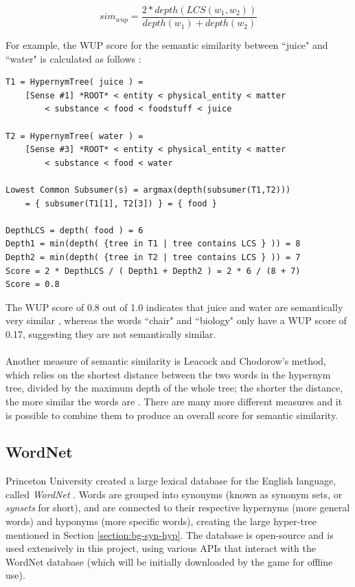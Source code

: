 \documentclass[11pt]{article}
\begin{document}
$$sim_{wup} = \frac{2*depth(LCS(w_1,w_2))}{depth(w_1)+depth(w_2)}$$

For example, the WUP score for the semantic similarity between ``juice" and ``water" is calculated as follows \cite{RefWorks:49}:

\begin{lstlisting}[frame=single]
T1 = HypernymTree( juice ) =
    [Sense #1] *ROOT* < entity < physical_entity < matter
    	< substance < food < foodstuff < juice

T2 = HypernymTree( water ) =
    [Sense #3] *ROOT* < entity < physical_entity < matter
    	< substance < food < water

Lowest Common Subsumer(s) = argmax(depth(subsumer(T1,T2)))
    = { subsumer(T1[1], T2[3]) } = { food }

DepthLCS = depth( food ) = 6
Depth1 = min(depth( {tree in T1 | tree contains LCS } )) = 8
Depth2 = min(depth( {tree in T2 | tree contains LCS } )) = 7
Score = 2 * DepthLCS / ( Depth1 + Depth2 ) = 2 * 6 / (8 + 7)
Score = 0.8
\end{lstlisting}

The WUP score of 0.8 out of 1.0 indicates that juice and water are semantically very similar \cite{RefWorks:47}, whereas the words ``chair" and ``biology" only have a WUP score of 0.17, suggesting they are not semantically similar.
\\
\\
Another measure of semantic similarity is Leacock and Chodorow's method, which relies on the shortest distance between the two words in the hypernym tree, divided by the maximum depth of the whole tree; the shorter the distance, the more similar the words are \cite{RefWorks:46}. There are many more different measures and it is possible to combine them to produce an overall score for semantic similarity.

\subsection{WordNet}

Princeton University created a large lexical database for the English language, called \textit{WordNet} \cite{RefWorks:20}. Words are grouped into synonyms (known as synonym sets, or \textit{synsets} for short), and are connected to their respective hypernyms (more general words) and hyponyms (more specific words), creating the large hyper-tree mentioned in Section \ref{section:bg-syn-hyp}. The database is open-source and is used extensively in this project, using various APIs that interact with the WordNet database (which will be initially downloaded by the game for offline use).
\end{document}
